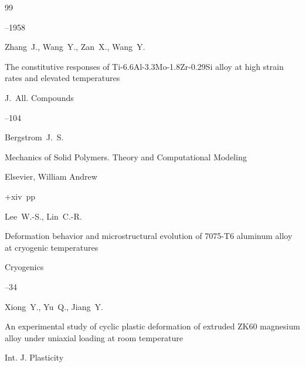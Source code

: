 \begin{thebibliography}{99}


--1958


 


\by Zhang~J., Wang~Y., Zan~X., Wang~Y.

\paper The constitutive responses of Ti-6.6Al-3.3Mo-1.8Zr-0.29Si alloy at high strain rates and elevated temperatures 

\jour J.~All. Compounds



--104







\by Bergstrom~J.~S.

\book Mechanics of Solid Polymers. Theory and Computational Modeling


\publ Elsevier, William Andrew

\publaddr 

+xiv~pp \nofrills







\by Lee~W.-S., Lin~C.-R.

\paper Deformation behavior and microstructural evolution of 7075-T6 aluminum alloy at cryogenic temperatures

\jour Cryogenics



--34







\by Xiong~Y., Yu~Q., Jiang~Y.

\paper An experimental study of cyclic plastic deformation of extruded ZK60 magnesium alloy under uniaxial loading at room temperature

\jour Int. J. Plasticity


\end{thebibliography}
